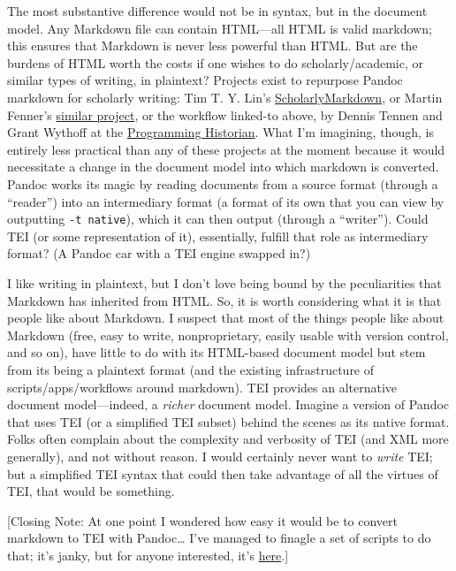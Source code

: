 \documentclass[
  12pt,
]{article}
\begin{document}
The most substantive difference would not be in syntax, but in the
document model. Any Markdown file can contain HTML---all HTML is valid
markdown; this ensures that Markdown is never less powerful than HTML.
But are the burdens of HTML worth the costs if one wishes to do
scholarly/academic, or similar types of writing, in plaintext? Projects
exist to repurpose Pandoc markdown for scholarly writing: Tim T. Y.
Lin's
\href{http://scholarlymarkdown.com/Scholarly-Markdown-Guide.html\#first-steps}{ScholarlyMarkdown},
or Martin Fenner's
\href{http://blog.martinfenner.org/2013/06/29/metadata-in-scholarly-markdown/}{similar
project}, or the workflow linked-to above, by Dennis Tennen and Grant
Wythoff at the
\href{http://programminghistorian.org/lessons/sustainable-authorship-in-plain-text-using-pandoc-and-markdown}{Programming
Historian}. What I'm imagining, though, is entirely less practical than
any of these projects at the moment because it would necessitate a
change in the document model into which markdown is converted. Pandoc
works its magic by reading documents from a source format (through a
``reader'') into an intermediary format (a format of its own that you
can view by outputting \texttt{-t\ native}), which it can then output
(through a ``writer''). Could TEI (or some representation of it),
essentially, fulfill that role as intermediary format? (A Pandoc car
with a TEI engine swapped in?)

I like writing in plaintext, but I don't love being bound by the
peculiarities that Markdown has inherited from HTML. So, it is worth
considering what it is that people like about Markdown. I suspect that
most of the things people like about Markdown (free, easy to write,
nonproprietary, easily usable with version control, and so on), have
little to do with its HTML-based document model but stem from its being
a plaintext format (and the existing infrastructure of
scripts/apps/workflows around markdown). TEI provides an alternative
document model---indeed, a \emph{richer} document model. Imagine a
version of Pandoc that uses TEI (or a simplified TEI subset) behind the
scenes as its native format. Folks often complain about the complexity
and verbosity of TEI (and XML more generally), and not without reason. I
would certainly never want to \emph{write} TEI; but a simplified TEI
syntax that could then take advantage of all the virtues of TEI, that
would be something.

{[}Closing Note: At one point I wondered how easy it would be to convert
markdown to TEI with Pandoc\ldots{} I've managed to finagle a set of
scripts to do that; it's janky, but for anyone interested, it's
\href{https://github.com/c-forster/markdown2tei}{here}.{]}
\end{document}
